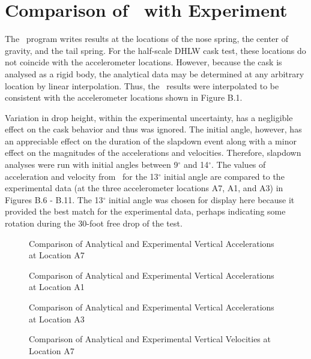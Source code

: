 \section{Comparison of \SLAP\ with Experiment}

The \SLAP\ program writes results at the locations of the nose spring,
the center of gravity, and the tail spring.  For the half-scale DHLW
cask test, these locations do not coincide with the accelerometer
locations. However, because the cask is analysed as a rigid body, the
analytical data may be determined at any arbitrary location by linear
interpolation.  Thus, the \SLAP\ results were interpolated to be 
consistent with the accelerometer locations shown in Figure B.1.

     Variation in drop height, within the experimental uncertainty,
has a negligible effect on the cask behavior and thus was ignored. 
The initial angle, however, has an appreciable effect on the duration
of the slapdown event along with a minor effect on the magnitudes of
the accelerations and velocities.  Therefore, slapdown analyses were
run with initial angles between 9$^\circ$ and 14$^\circ$. 
The values of acceleration and velocity from \SLAP\
for the 13$^\circ$ initial angle are compared to the experimental data
(at the three accelerometer locations A7, A1, and A3) in Figures B.6
- B.11.  The 13$^\circ$ initial angle was chosen for display here
because it
provided the best match for the experimental data, perhaps indicating
some rotation during the 30-foot free drop 
of the test. 

\begin{figure}
\vspace{3.5 in}
\caption{Comparison of Analytical and Experimental Vertical 
Accelerations at Location A7}
\end{figure}

\begin{figure}
\vspace{3.5 in}
\caption{Comparison of Analytical and Experimental Vertical 
Accelerations at Location A1}
\end{figure}

\begin{figure}
\vspace{3.5 in}
\caption{Comparison of Analytical and Experimental Vertical 
Accelerations at Location A3}
\end{figure}

\begin{figure}
\vspace{3.5 in}
\caption{Comparison of Analytical and Experimental Vertical 
Velocities at Location A7}
\end{figure}

